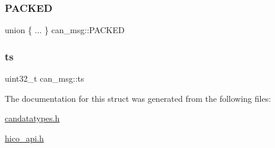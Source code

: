 \subsubsection{\texorpdfstring{P\+A\+C\+K\+ED}{PACKED}\hspace{0.1cm}{\footnotesize\ttfamily [2/2]}}
{\footnotesize\ttfamily union \{ ... \}  can\+\_\+msg\+::\+P\+A\+C\+K\+ED}

\mbox{\label{structcan__msg_a157aaad2daf039f59606522c6a51663a}} 
\subsubsection{\texorpdfstring{ts}{ts}}
{\footnotesize\ttfamily uint32\+\_\+t can\+\_\+msg\+::ts}



The documentation for this struct was generated from the following files\+:\begin{DoxyCompactItemize}
\item 
\hyperlink{candatatypes_8h}{candatatypes.\+h}\item 
\hyperlink{hico__api_8h}{hico\+\_\+api.\+h}\end{DoxyCompactItemize}
